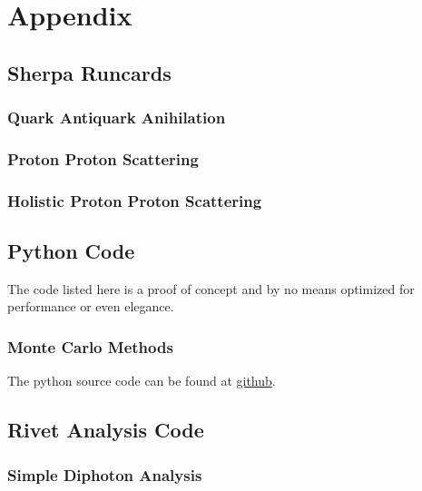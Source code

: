 \chapter{Appendix}%
\label{chap:appendix}

\section{Sherpa Runcards}%
\label{sec:runcards}

\subsection{Quark Antiquark Anihilation}%
\label{sec:qqggruncard}

\subsection{Proton Proton Scattering}%
\label{sec:ppruncard}

\subsection{Holistic Proton Proton Scattering}%
\label{sec:ppruncardfull}


\section{Python Code}%
\label{sec:pycode}
The code listed here is a proof of concept and by no means optimized
for performance or even elegance.

\subsection{Monte Carlo Methods}%
\label{sec:mcpy}
The python source code can be found at
\href{https://github.com/vale981/bachelor_thesis/blob/master/prog/python/qqgg/monte_carlo.py}{github}.

\section{Rivet Analysis Code}%
\label{sec:rivetcode}

\subsection{Simple Diphoton Analysis}%
\label{sec:simpdiphotriv}

